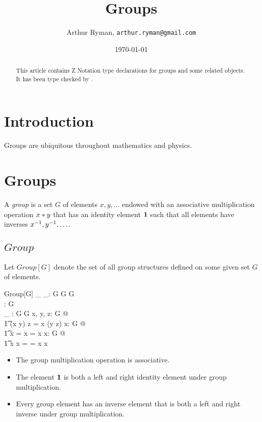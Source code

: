 \documentclass[11pt, oneside]{article}
\title{Groups}
\author{Arthur Ryman, {\tt arthur.ryman@gmail.com}}
\date{\today}
\begin{document}
\maketitle

\begin{abstract}
This article contains Z Notation type declarations for groups and some related objects.
It has been type checked by \fuzz.
\end{abstract}

\section{Introduction}

Groups are ubiquitous throughout mathematics and physics.

\section{Groups}

A {\it group} is a set $G$ of elements $x, y, \ldots$ endowed with an associative multiplication operation $x \mathbin{*} y$
that has an identity element $\mathbf{1}$ such that all elements have inverses $x ^{-1}, y ^{-1}, \ldots$.

\subsection{$Group$}

Let $Group[G]$ denote the set of all group structures defined on some given set $G$ of elements.

\begin{schema}{Group}[G]
	\_ \gmul \_: G \cross G \fun G \\
	\gone: G \\
	\_ \ginv: G \fun G
\where
	\forall x, y, z: G @ \\
	\t1	(x \gmul y) \gmul z = x \gmul (y \gmul z)
\also
	\forall x: G @ \\
	\t1	x \gmul \gone = x = \gone \gmul x
\also
	\forall x: G @ \\
	\t1	x \gmul x \ginv = \gone = x \ginv \gmul x
\end{schema}
\begin{itemize}

\item The group multiplication operation is associative.

\item The element $\mathbf{1}$ is both a left and right identity element under group multiplication.

\item Every group element has an inverse element that is both a left and right inverse under group multiplication.

\end{itemize}
\end{document}
